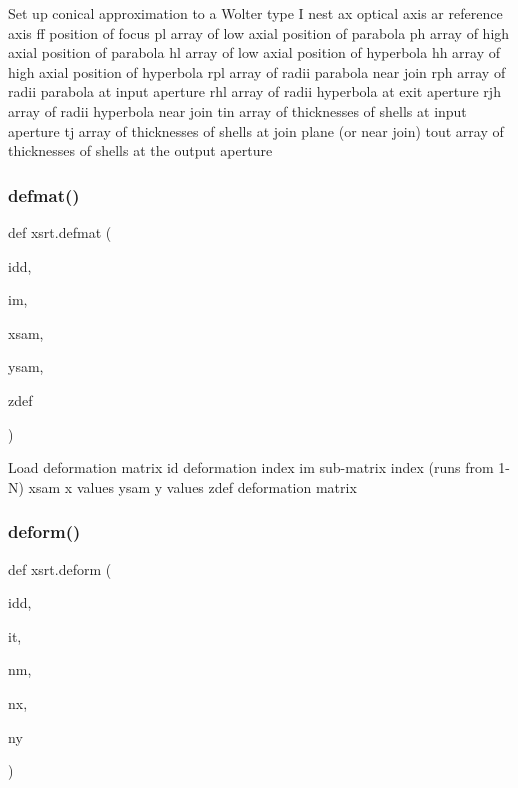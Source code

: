 \begin{DoxyVerb}Set up conical approximation to a Wolter type I nest
    ax           optical axis
    ar           reference axis
    ff           position of focus
    pl           array of low axial position of parabola
    ph           array of high axial position of parabola
    hl           array of low axial position of hyperbola
    hh           array of high axial position of hyperbola
    rpl          array of radii parabola near join
    rph          array of radii parabola at input aperture
    rhl          array of radii hyperbola at exit aperture
    rjh          array of radii hyperbola near join
    tin          array of thicknesses of shells at input aperture
    tj           array of thicknesses of shells at join plane (or near join)
    tout         array of thicknesses of shells at the output aperture
\end{DoxyVerb}
 \mbox{\label{namespacexsrt_a69d7e8172ff6743e38fc4666ef698e15}} 
\subsubsection{\texorpdfstring{defmat()}{defmat()}}
{\footnotesize\ttfamily def xsrt.\+defmat (\begin{DoxyParamCaption}\item[{}]{idd,  }\item[{}]{im,  }\item[{}]{xsam,  }\item[{}]{ysam,  }\item[{}]{zdef }\end{DoxyParamCaption})}

\begin{DoxyVerb}Load deformation matrix
    id       deformation index
    im       sub-matrix index (runs from 1-N)
    xsam     x values
    ysam     y values
    zdef     deformation matrix
\end{DoxyVerb}
 \mbox{\label{namespacexsrt_aa1c9cab5435878d44e9db3e5f0b82e71}} 
\subsubsection{\texorpdfstring{deform()}{deform()}}
{\footnotesize\ttfamily def xsrt.\+deform (\begin{DoxyParamCaption}\item[{}]{idd,  }\item[{}]{it,  }\item[{}]{nm,  }\item[{}]{nx,  }\item[{}]{ny }\end{DoxyParamCaption})}


